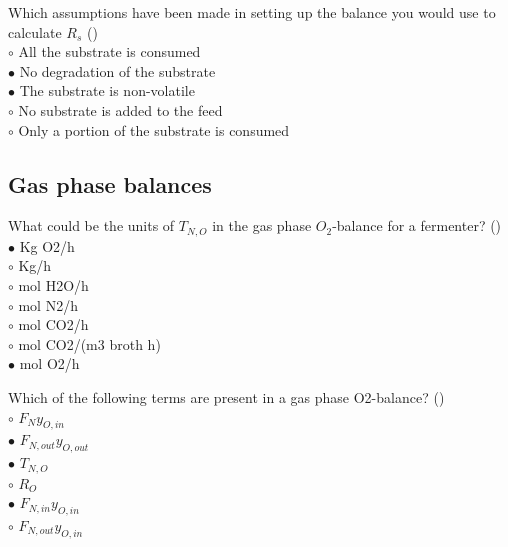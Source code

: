 \documentclass[]{beamer}
\begin{document}
\begin{frame}[shrink] {}
\addtocounter{answers}{1}
\color{blue}
Which assumptions have been made in setting up the balance you would use to calculate $R_s$ ()\\
\color{black}
\setlength{\parindent}{-0.4cm}
{\color{red}$\circ$}   All the substrate is consumed  \\
{\color{red}$\bullet$} No degradation of the substrate   \\
{\color{red}$\bullet$} The substrate is non-volatile   \\
{\color{red}$\circ$} No substrate is added to the feed  \\
{\color{red}$\circ$} Only a portion of the substrate is consumed
\end{frame}

\subsection{Gas phase balances}
\setcounter{answers}{0}

\begin{frame}[shrink] {}
\addtocounter{answers}{1}
\color{blue}
What could be the units of $T_{N,O}$ in the gas phase $O_2$-balance for a fermenter? ()\\
\color{black}
\setlength{\parindent}{-0.4cm}
{\color{red}$\bullet$} Kg O2/h  \\
{\color{red}$\circ$} Kg/h  \\
{\color{red}$\circ$} mol H2O/h\\
{\color{red}$\circ$} mol N2/h  \\
{\color{red}$\circ$} mol CO2/h \\
{\color{red}$\circ$} mol CO2/(m3 broth h) \\
{\color{red}$\bullet$} mol O2/h
\end{frame}

\begin{frame}[shrink] {}
\addtocounter{answers}{1}
\color{blue}
Which of the following terms are present in a gas phase O2-balance?  ()\\
\color{black}
\setlength{\parindent}{-0.4cm}
{\color{red}$\circ$}   $F_{N}y_{O,in}$\\   
{\color{red}$\bullet$}   $F_{N,out}y_{O,out}$\\   
{\color{red}$\bullet$} $T_{N,O}$\\
{\color{red}$\circ$} $R_O$\\
{\color{red}$\bullet$}   $F_{N,in}y_{O,in}$  \\ 
{\color{red}$\circ$}   $F_{N,out}y_{O,in}$   
\end{frame}
\end{document}
